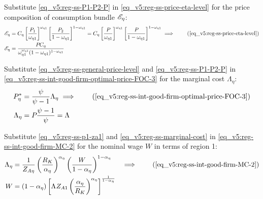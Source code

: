 \documentclass[../thesis.tex]{subfiles}
\begin{document}
Substitute \ref{eq_v5:reg-ss-P1-P2-P} in \ref{eq_v5:reg-ss-price-eta-level} for the price composition of consumption bundle $\te[]$:
\begin{align}
	\te[] &= C_{\eta} \left[ \frac{P_{1}}{\omega_{\eta 1}} \right]^{\omega_{\eta 1}} \left[ \frac{P_{2}}{1 -\omega_{\eta 1}} \right]^{1 -\omega_{\eta 1}} = C_{\eta} \left[ \frac{P_{}}{\omega_{\eta 1}} \right]^{\omega_{\eta 1}} \left[ \frac{P_{}}{1 -\omega_{\eta 1}} \right]^{1 -\omega_{\eta 1}} \implies \tag{\ref{eq_v5:reg-ss-price-eta-level}} \\
	\te[] &= \frac{P_{} C_{\eta}}{\omega_{\eta 1}^{\omega_{\eta 1}} (1 -\omega_{\eta 1})^{1 -\omega_{\eta 1}}} \label{eq_v5:reg-ss-te}
\end{align}

Substitute \ref{eq_v5:reg-ss-general-price-level} and \ref{eq_v5:reg-ss-P1-P2-P} in \ref{eq_v5:reg-ss-int-good-firm-optimal-price-FOC-3} for the marginal cost $\Lambda_{\eta}$:
\begin{align}
	P_{\eta}^{\ast} &= \frac{\psi}{\psi-1} \Lambda_{\eta} \implies \tag{\ref{eq_v5:reg-ss-int-good-firm-optimal-price-FOC-3}} \\
	\Lambda_{\eta} &= P_{} \frac{\psi-1}{\psi} = \Lambda_{} \label{eq_v5:reg-ss-marginal-cost}
\end{align}

Substitute \ref{eq_v5:reg-ss-p1-za1} and \ref{eq_v5:reg-ss-marginal-cost} in \ref{eq_v5:reg-ss-int-good-firm-MC-2} for the nominal wage $W$ in terms of region 1:
\begin{alignat}{2}
	\Lambda_{\eta} &= \frac{1}{Z_{A\eta}} \left( \frac{R_K}{{\alpha_{\eta}}} \right)^{{\alpha_{\eta}}} \left( \frac{W}{1-\alpha_{\eta}} \right)^{1-\alpha_{\eta}} &\implies \tag{\ref{eq_v5:reg-ss-int-good-firm-MC-2}} \\ 
	W &= (1-\alpha_{\eta}) \left[ \Lambda_{} Z_{A1} \left( \frac{{\alpha_{\eta}}}{R_K} \right)^{{\alpha_{\eta}}} \right]^\frac{1}{1-\alpha_{\eta}} & \label{eq_v5:reg-ss-nominal-wage}
\end{alignat}

\begin{comment}
	Substitute \ref{eq_v5:reg-ss-nominal-wage} in \ref{eq_v5:reg-ss-int-good-firm-MC-2} for the technology level of region 2, $Z_{A2}$:
	\begin{align}
		\Lambda_{\eta} &= \frac{1}{Z_{A\eta}} \left( \frac{R_K}{{\alpha_{\eta}}} \right)^{{\alpha_{\eta}}} \left( \frac{W}{1-\alpha_{\eta}} \right)^{1-\alpha_{\eta}} \implies \tag{\ref{eq_v5:reg-ss-int-good-firm-MC-2}} \\
		Z_{A2} &= \frac{1}{\Lambda_{}} \left( \frac{R_K}{{\alpha_{\eta}}} \right)^{{\alpha_{\eta}}} \left( \frac{W}{1-\alpha_{\eta}} \right)^{1-\alpha_{\eta}} \label{eq_v5:reg-ss-za2}
	\end{align}
\end{comment}
\end{document}
